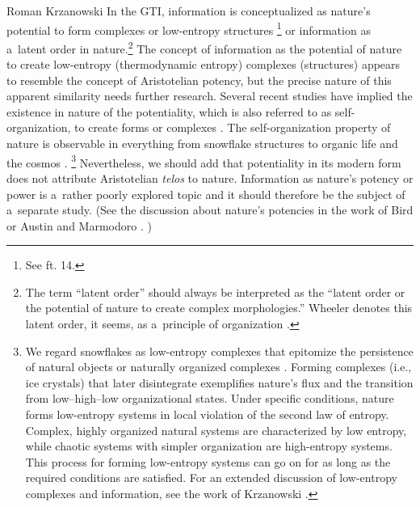 \begin{artengenv}{Roman Krzanowski}
In the GTI, information is conceptualized as nature's potential to form complexes or low-entropy structures 
\parencite[see][]{krzanowski_inquiry_2023}%
\footnote{See ft. 14.} or information as a~latent order in nature.\footnote{The term ``latent order'' should always be interpreted as the ``latent order or the potential of nature to create complex morphologies.'' Wheeler denotes this latent order, it seems, as a~principle of organization 
\parencite[][]{wheeler_information_1989}.%
} The concept of information as the potential of nature to create low-entropy (thermodynamic entropy) complexes (structures) appears to resemble the concept of Aristotelian potency, but the precise nature of this apparent similarity needs further research. Several recent studies have implied the existence in nature of the potentiality, which is also referred to as self-organization, to create forms or complexes 
\parencite[e.g.,][]{eigen_laws_1993}. %
 The self-organization property of nature is observable in everything from snowflake structures to organic life and the cosmos 
\parencites[e.g.,][]{reeves_heure_1986}[][]{schrodinger_what_2012}.%
\footnote{We regard snowflakes as low-entropy complexes that epitomize the persistence of natural objects or naturally organized complexes 
\parencite[][]{reeves_heure_1986}. %
 Forming complexes (i.e., ice crystals) that later disintegrate exemplifies nature's flux and the transition from low–high–low organizational states. Under specific conditions, nature forms low-entropy systems in local violation of the second law of entropy. Complex, highly organized natural systems are characterized by low entropy, while chaotic systems with simpler organization are high-entropy systems. This process for forming low-entropy systems can go on for as long as the required conditions are satisfied. For an extended discussion of low-entropy complexes and information, see the work of Krzanowski 
\parencite*[][]{krzanowski_inquiry_2023}.%
} Nevertheless, we should add that potentiality in its modern form does not attribute Aristotelian \textit{telos} to nature. Information as nature's potency or power is a~rather poorly explored topic and it should therefore be the subject of a~separate study. (See the discussion about nature's potencies in the work of Bird 
\parencite*[][]{bird_natures_2007} %
 or Austin and Marmodoro 
\parencite*[][]{simpson_structural_2017}.%
)




\end{artengenv}
